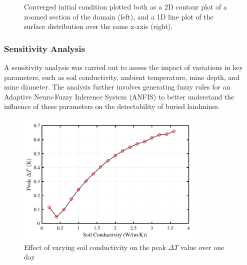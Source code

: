 \begin{figure}[htbp]
\begin{minipage}[b]{0.48\textwidth}
        \end{minipage}
        \caption{Converged initial condition plotted both as a 2D contour plot of a zoomed section of the domain (left), and a 1D line plot of the surface distribution over the same x-axis (right).}
        \label{fig:combined_thermal} %
    \end{figure}
    
    
    \subsubsection{Sensitivity Analysis}
    A sensitivity analysis was carried out to assess the impact of variations in key parameters, such as soil conductivity, ambient temperature, mine depth, and mine diameter. The analysis further involves generating fuzzy rules for an Adaptive Neuro-Fuzzy Inference System (ANFIS) to better understand the influence of these parameters on the detectability of buried landmines.
    
    \begin{figure}[htbp]
        \centering
        \includegraphics[width=0.8\textwidth]{figs/Rory/thermal_sensitivity_conductivity.pdf}
        \caption{Effect of varying soil conductivity on the peak $\Delta T$ value over one day}
        \label{fig:thermal_sensitivity_conductivity}
    \end{figure}
    
    